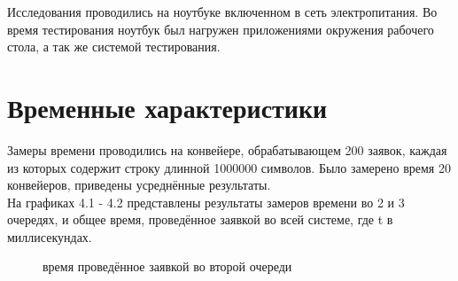 \documentclass[12pt,a4paper]{report}
\begin{document}
Исследования проводились на ноутбуке включенном в сеть электропитания. Во время тестирования ноутбук был нагружен приложениями окружения рабочего стола, а так же системой тестирования.

\section{Временные характеристики}

Замеры времени проводились на конвейере, обрабатывающем 200 заявок, каждая из которых содержит строку 
длинной 1000000 символов. 
Было замерено время 20 конвейеров, приведены усреднённые результаты.\\

На графиках 4.1 - 4.2 представлены результаты замеров времени во 2 и 3 очередях, и общее время,
проведённое заявкой во всей системе, где t в миллисекундах.

\begin{figure}[h!]
	\caption{время проведённое заявкой во второй очереди}
	\label{fig:image}
\end{figure}
\end{document}
